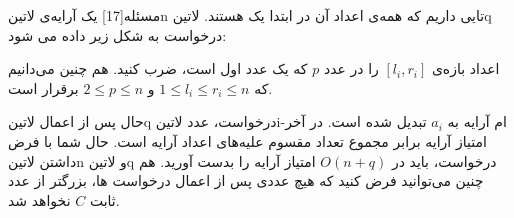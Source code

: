 ‌مسئله[17]  
یک آرایه‌ی ‌لاتین{n} تایی داریم که همه‌ی اعداد آن در ابتدا یک هستند. ‌لاتین{q} درخواست به شکل زیر داده می شود:

اعداد بازه‌ی 
$[l_i, r_i]$
را در عدد 
$p$
که یک عدد اول است،‌ ضرب کنید. هم چنین می‌دانیم که 
$1 \le l_i \le r_i \le n$
و
$2 \le p \le n$
برقرار است.

حال پس از اعمال ‌لاتین{q} درخواست، عدد ‌لاتین{i}-ام آرایه به 
$a_i$
تبدیل شده است. در آخر امتیاز آرایه برابر مجموع تعداد مقسوم علیه‌های اعداد آرایه است. حال شما با فرض داشتن ‌لاتین{n} و ‌لاتین{q} درخواست، باید در 
$O(n+q)$
امتیاز آرایه را بدست آورید. هم چنین می‌توانید فرض کنید که هیچ عددی پس از اعمال درخواست ها،‌ بزرگتر از عدد ثابت 
$C$
نخواهد شد.

